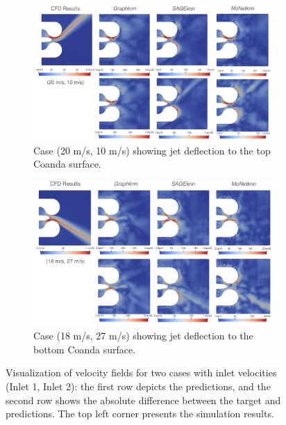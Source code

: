\begin{figure}[ht]
    \centering
    \begin{subfigure}[b]{14cm}
        \centering
        \includegraphics[width=\textwidth]{images/Methodology/Asset 18.png}
        \caption{Case (20 m/s, 10 m/s) showing jet deflection to the top Coanda surface.}
        \label{fig:allvel1}
    \end{subfigure}
    \begin{subfigure}[b]{14cm}
        \centering
        \includegraphics[width=\textwidth]{images/Methodology/Asset 17.png}
        \caption{Case (18 m/s, 27 m/s) showing jet deflection to the bottom Coanda surface.}
        \label{fig:allvel2}
    \end{subfigure}
    \caption{Visualization of velocity fields for two cases with inlet velocities (Inlet 1, Inlet 2): the first row depicts the predictions, and the second row shows the absolute difference between the target and predictions. The top left corner presents the simulation results.}
    \label{2vel1}
\end{figure}
